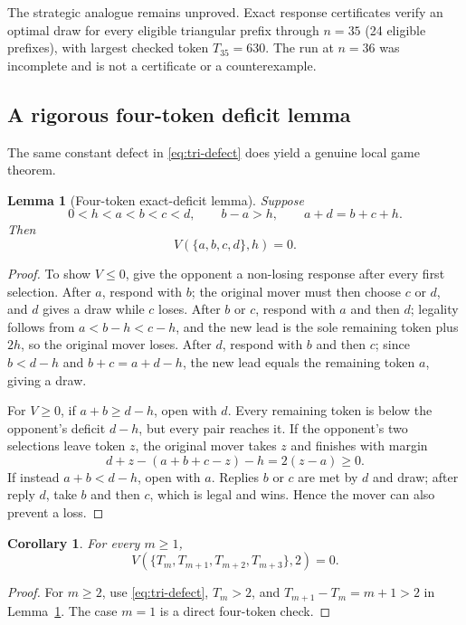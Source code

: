 \documentclass[11pt]{article}
\newtheorem{lemma}[theorem]{Lemma}
\newtheorem{corollary}[theorem]{Corollary}
\theoremstyle{remark}
\begin{document}
The strategic analogue remains unproved.  Exact response certificates verify
an optimal draw for every eligible triangular prefix through $n=35$ (24
eligible prefixes), with largest checked token $T_{35}=630$.  The run at
$n=36$ was incomplete and is not a certificate or a counterexample.

\subsection{A rigorous four-token deficit lemma}
The same constant defect in \eqref{eq:tri-defect} does yield a genuine local
game theorem.

\begin{lemma}[Four-token exact-deficit lemma]\label{lem:four-deficit}
Suppose
\[
0<h<a<b<c<d,\qquad b-a>h,\qquad a+d=b+c+h.
\]
Then
\[
V(\{a,b,c,d\},h)=0.
\]
\end{lemma}

\begin{proof}
To show $V\le0$, give the opponent a non-losing response after every first
selection.  After $a$, respond with $b$; the original mover must then choose
$c$ or $d$, and $d$ gives a draw while $c$ loses.  After $b$ or $c$, respond
with $a$ and then $d$; legality follows from $a<b-h<c-h$, and the new lead is
the sole remaining token plus $2h$, so the original mover loses.  After $d$,
respond with $b$ and then $c$; since
$b<d-h$ and $b+c=a+d-h$, the new lead equals the remaining token $a$, giving
a draw.

For $V\ge0$, if $a+b\ge d-h$, open with $d$.  Every remaining token is below
the opponent's deficit $d-h$, but every pair reaches it.  If the opponent's
two selections leave token $z$, the original mover takes $z$ and finishes
with margin
\[
d+z-(a+b+c-z)-h=2(z-a)\ge0.
\]
If instead $a+b<d-h$, open with $a$.  Replies $b$ or $c$ are met by $d$ and
draw; after reply $d$, take $b$ and then $c$, which is legal and wins.  Hence
the mover can also prevent a loss.
\end{proof}

\begin{corollary}\label{cor:tri4}
For every $m\ge1$,
\[
V(\{T_m,T_{m+1},T_{m+2},T_{m+3}\},2)=0.
\]
\end{corollary}

\begin{proof}
For $m\ge2$, use \eqref{eq:tri-defect}, $T_m>2$, and
$T_{m+1}-T_m=m+1>2$ in Lemma~\ref{lem:four-deficit}.  The case $m=1$ is a
direct four-token check.
\end{proof}
\end{document}
